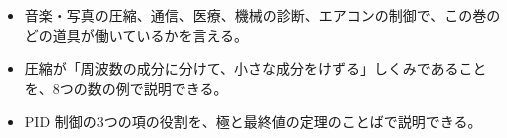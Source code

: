 \newcommand\kixmline[1]{\par\addvspace{3pt}{\centering #1\par}\addvspace{3pt}\noindent\ignorespaces}
\newcommand\kixmframe[2][100mm]{\par\addvspace{4pt}{\centering\tikz\node[draw=\bkTT, line width=0.9pt, fill=bkTheme!6, rounded corners=1.5mm, inner xsep=6mm, inner ysep=2.5mm, align=center, text width=#1]{#2};\par}\addvspace{4pt}\noindent\ignorespaces}
\newcommand\kixmyomu[3]{\par\addvspace{4pt}\noindent\begin{tikzpicture}
  \node[kixm name, anchor=west, text width=34mm, align=flush center] (a) at (0,0) {#1};
  \node[kixm tag, anchor=south west] at ([yshift=0.6mm]a.north west) {名前};
  \node[anchor=west, text width=\dimexpr\linewidth-44mm\relax, font=\small, align=flush left, inner sep=0pt] (b) at ([xshift=4mm]a.east) {#2\par\vspace{1pt}{\sffamily\bfseries 計算のしかた：}#3};
\end{tikzpicture}\par\addvspace{4pt}\noindent\ignorespaces}
\makeatother


\begin{goal}
\begin{itemize}[label={\color{\bkTT}●}, leftmargin=1.6\zw, itemsep=0pt, topsep=1pt]
\item {}\enspace 音楽・写真の圧縮、通信、医療、機械の診断、エアコンの制御で、この巻のどの道具が働いているかを言える。
\item {}\enspace 圧縮が「周波数の成分に分けて、小さな成分をけずる」しくみであることを、8つの数の例で説明できる。
\item {}\enspace PID 制御の3つの項の役割を、極と最終値の定理のことばで説明できる。
\end{itemize}
\end{goal}

